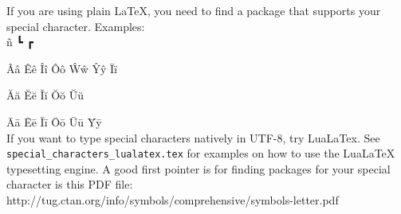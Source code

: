 \documentclass{article}
\begin{document}
If you are using plain LaTeX, you need to find a package that supports your
special character. Examples:
\\

\textdzlig \hspace{0.2em} \textdctzlig \hspace{0.2em} ñ ┗ ┏

Ââ Êê Îî Ôô Ŵŵ Ŷŷ Ïï

Ăă Ĕĕ Ĭĭ Ŏŏ Ŭŭ

Āā Ēē Īī Ōō Ūū Ȳȳ
\\

If you want to type special characters natively in UTF-8, try LuaLaTex. See
\texttt{special\_characters\_lualatex.tex} for examples on how to use the
LuaLaTeX typesetting engine. A good first pointer is for finding packages for your special character is this
PDF file:
\\
http://tug.ctan.org/info/symbols/comprehensive/symbols-letter.pdf
\end{document}
